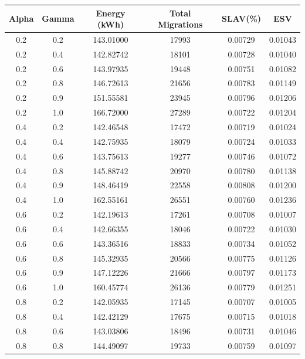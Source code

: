 \documentclass[a4paper,12pt]{Classes/RoboticsLaTeX}
\begin{document}
        \begin{table}[H]
        \centering
        \small
        \begin{tabular}{|c|c|c|c|c|c|}
        \hline
        \textbf{Alpha} & \textbf{Gamma} & \textbf{Energy (kWh)} & \textbf{Total Migrations} & \textbf{SLAV(\%)} & \textbf{ESV} \\ 
        \hline
        0.2 & 0.2 & 143.01000 & 17993 & 0.00729 & 0.01043 \\ 
        0.2 & 0.4 & 142.82742 & 18101 & 0.00728 & 0.01040 \\ 
        0.2 & 0.6 & 143.97935 & 19448 & 0.00751 & 0.01082 \\ 
        0.2 & 0.8 & 146.72613 & 21656 & 0.00783 & 0.01149 \\ 
        0.2 & 0.9 & 151.55581 & 23945 & 0.00796 & 0.01206 \\ 
        0.2 & 1.0 & 166.72000 & 27289 & 0.00722 & 0.01204 \\ 
        0.4 & 0.2 & 142.46548 & 17472 & 0.00719 & 0.01024 \\ 
        0.4 & 0.4 & 142.75935 & 18079 & 0.00724 & 0.01033 \\ 
        0.4 & 0.6 & 143.75613 & 19277 & 0.00746 & 0.01072 \\ 
        0.4 & 0.8 & 145.88742 & 20970 & 0.00780 & 0.01138 \\ 
        0.4 & 0.9 & 148.46419 & 22558 & 0.00808 & 0.01200 \\ 
        0.4 & 1.0 & 162.55161 & 26551 & 0.00760 & 0.01236 \\ 
        0.6 & 0.2 & 142.19613 & 17261 & 0.00708 & 0.01007 \\ 
        0.6 & 0.4 & 142.66355 & 18046 & 0.00722 & 0.01030 \\ 
        0.6 & 0.6 & 143.36516 & 18833 & 0.00734 & 0.01052 \\ 
        0.6 & 0.8 & 145.32935 & 20566 & 0.00775 & 0.01126 \\ 
        0.6 & 0.9 & 147.12226 & 21666 & 0.00797 & 0.01173 \\ 
        0.6 & 1.0 & 160.45774 & 26136 & 0.00779 & 0.01251 \\ 
        0.8 & 0.2 & 142.05935 & 17145 & 0.00707 & 0.01005 \\ 
        0.8 & 0.4 & 142.42129 & 17675 & 0.00715 & 0.01018 \\ 
        0.8 & 0.6 & 143.03806 & 18496 & 0.00731 & 0.01046 \\ 
        0.8 & 0.8 & 144.49097 & 19733 & 0.00759 & 0.01097 \\ 

\end{tabular}
\end{table}
\end{document}
